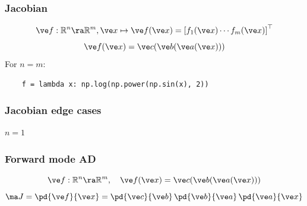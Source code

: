 \documentclass[fleqn,10pt]{beamer}
\begin{document}
\begin{frame}[fragile]
    \frametitle{Jacobian}
    \begin{equation*}
        \ve f: \mathbb R^n \ra \mathbb R^m, \ve x\mapsto \ve f(\ve x) = \left[f_1(\ve x) \cdots f_m(\ve x)\right]^\top
    \end{equation*}
    \begin{equation*}
        \ve f(\ve x) = \ve c(\ve b(\ve a(\ve x)))
    \end{equation*}
    For $n=m$:
    \begin{verbatim}
    f = lambda x: np.log(np.power(np.sin(x), 2))
    \end{verbatim}
    \vfill
\end{frame}

\begin{frame}
    \frametitle{Jacobian edge cases}
    $n=1$
    \edgecol
\end{frame}


\begin{frame}
    \frametitle{Forward mode AD}
    \begin{equation*}
        \ve f: \mathbb R^n \ra \mathbb R^m,\quad\ve f(\ve x) = \ve c(\ve b(\ve a(\ve x)))
    \end{equation*}
    \begin{equation*}
        \ma J=\pd{\ve f}{\ve x} = \pd{\ve c}{\ve b}\,\pd{\ve b}{\ve a}\,\pd{\ve a}{\ve x}
    \end{equation*}
    \vfill
    \vfill
\end{frame}
\end{document}
